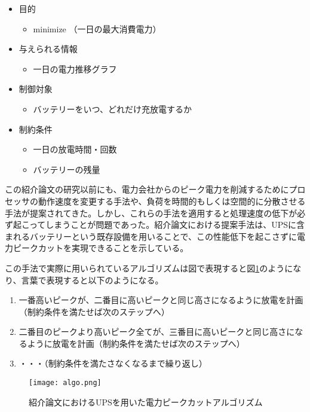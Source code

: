 \begin{itemize}
  \item 目的
    \begin{itemize}
      \item minimize （一日の最大消費電力）
    \end{itemize}
  \item 与えられる情報
    \begin{itemize}
      \item 一日の電力推移グラフ
    \end{itemize}
  \item 制御対象
    \begin{itemize}
      \item バッテリーをいつ、どれだけ充放電するか
    \end{itemize}
  \item 制約条件
    \begin{itemize}
      \item 一日の放電時間・回数
      \item バッテリーの残量
    \end{itemize}
\end{itemize}

この紹介論文の研究以前にも、電力会社からのピーク電力を削減するためにプロセッサの動作速度を変更する手法\cite{Chen:2005:MSE:1064212.1064253,Isci:2006:AEM:1194816.1194850,Raghavendra:2008:NPS:1353534.1346289,4658632,4658631}や、負荷を時間的もしくは空間的に分散させる手法\cite{Unleash,Moore:2005:MSC:1247360.1247365}が提案されてきた。しかし、これらの手法を適用すると処理速度の低下が必ず起こってしまうことが問題であった。紹介論文における提案手法は、UPSに含まれるバッテリーという既存設備を用いることで、この性能低下を起こさずに電力ピークカットを実現できることを示している。

この手法で実際に用いられているアルゴリズムは図で表現すると図\ref{fig:algo}のようになり、言葉で表現すると以下のようになる。

\begin{enumerate}
  \item 一番高いピークが、二番目に高いピークと同じ高さになるように放電を計画（制約条件を満たせば次のステップへ）
  \item 二番目のピークより高いピーク全てが、三番目に高いピークと同じ高さになるように放電を計画（制約条件を満たせば次のステップへ）
  \item ・・・（制約条件を満たさなくなるまで繰り返し）
\end{enumerate}

\begin{figure}[t]
 \begin{center}
  \texttt{[image: algo.png]}
 \end{center}
 \caption{紹介論文\cite{Govindan:2011:BLT:2024723.2000105}におけるUPSを用いた電力ピークカットアルゴリズム}
 \label{fig:algo}
\end{figure}

